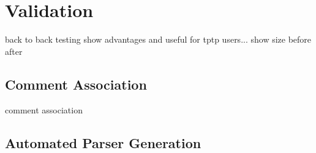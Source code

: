 
\chapter{Validation}\label{sec:Validation}
back to back testing
show advantages and useful for tptp users...
show size before after 
\section{Comment Association}\label{sec:ValidationCommentAssociation}
comment association


\section{Automated Parser Generation}\label{sec:ValidationAutomatedParserGeneration}
